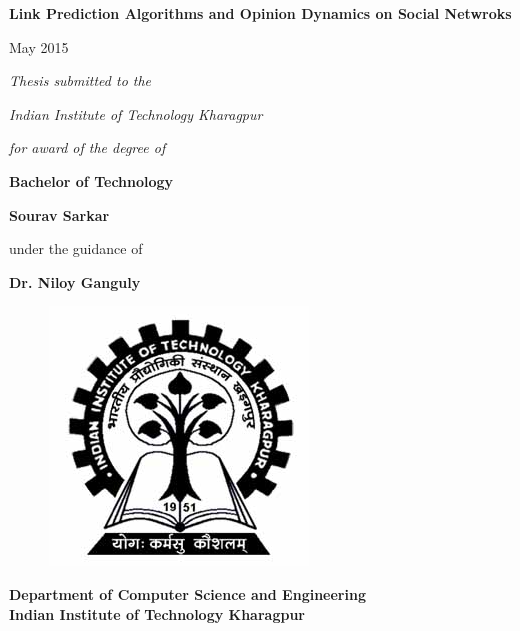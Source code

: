 \begin{titlepage}
{\centering \huge { \textbf{
     Link Prediction Algorithms and Opinion Dynamics on Social Netwroks}} \par 
}

\thispagestyle{empty}
\vspace{1cm}
\begin{center}
{
   
   May 2015
}
\end{center}
\vspace{1cm}
{\centering \large {\textit{ 
     Thesis submitted to the } }  \par 
}
 
\vspace{0.5cm}
{\centering \large {\textit{ 
     Indian Institute of Technology 
     Kharagpur } }  \par 
}
 
\vspace{0.5cm}
{\centering \large {\textit{ 
      for award of the degree of} }  \par 
}
 
{\centering \Large { \textbf { 
  Bachelor of Technology}} \par
}

\vspace{0.875cm}
{\par}
\vspace{0.875cm}
{\centering \large \textbf{Sourav Sarkar}\par}
\vspace{0.75cm}
{\centering \large under the guidance of\par}
\vspace{0.75cm}
{\centering \large \textbf{Dr. Niloy Ganguly}\par}
\vspace{1cm}
\begin{figure}[h]
    \centering
    \includegraphics[scale=0.2]{cover_page/images/logo.jpg}
\end{figure}
\begin{center}
{
   \large \textbf{Department of Computer Science and Engineering} \\
   \large \textbf{Indian Institute of Technology Kharagpur}
   
}
\end{center}
\end{titlepage}